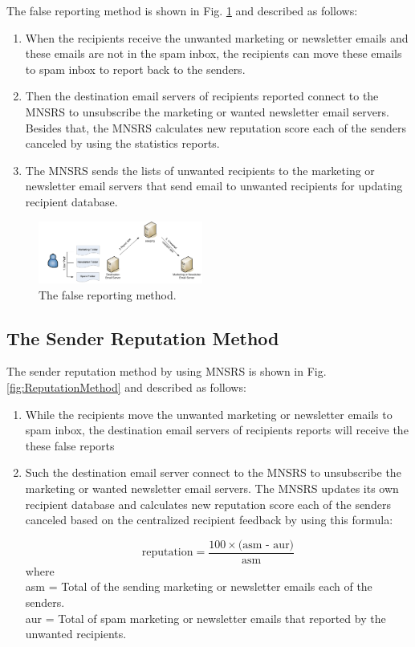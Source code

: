 \documentclass[conference]{IEEEtran}
\begin{document}
The false reporting method is shown in Fig. \ref{fig:FaultReportingMethod} and described as follows:
\begin{enumerate}
  \item When the recipients receive the unwanted marketing or newsletter emails and these emails are not in the spam inbox, the recipients can move these emails to spam inbox to report back to the senders.
  \item Then the destination email servers of recipients reported connect to the MNSRS to unsubscribe the marketing or wanted newsletter email servers.
  Besides that, the MNSRS calculates new reputation score each of the senders canceled by using the statistics reports.
  \item The MNSRS sends the lists of unwanted recipients to the marketing or newsletter email servers that send email to unwanted recipients for updating recipient database. 
\end{enumerate}

\begin{figure}
\centering
\includegraphics[width=0.48\textwidth]{5.pdf}
\caption{The false reporting method.}
\label{fig:FaultReportingMethod}
\end{figure}

\subsection{The Sender Reputation Method}

The sender reputation method by using MNSRS is shown in Fig. \ref{fig:ReputationMethod} and described as follows:
\begin{enumerate}
  \item While the recipients move the unwanted marketing or newsletter emails to spam inbox, the destination email servers of recipients reports will receive the these false reports
  \item Such the destination email server connect to the MNSRS to unsubscribe the marketing or wanted newsletter email servers.
The MNSRS updates its own recipient database and calculates new reputation score each of the senders canceled based on the centralized recipient feedback by using this formula:

$$ \text{reputation} =  \frac{ 100\times{\text{(asm - aur)}}}{\text{asm}} $$
where\mbox{ }\\
asm = Total of the sending marketing or newsletter emails each of the senders.\\
aur = Total of spam  marketing or newsletter emails that reported by the unwanted recipients.
\end{enumerate}
\end{document}
